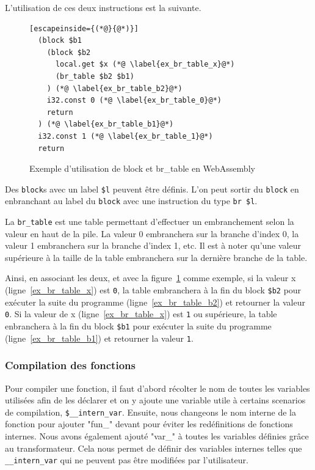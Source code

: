 \documentclass{rapportECL}
\begin{document}
L'utilisation de ces deux instructions est la suivante.

\begin{figure}[H]
	\begin{lstlisting}[escapeinside={(*@}{@*)}]
  (block $b1
    (block $b2
      local.get $x (*@ \label{ex_br_table_x}@*)
      (br_table $b2 $b1)
    ) (*@ \label{ex_br_table_b2}@*)
    i32.const 0 (*@ \label{ex_br_table_0}@*)
    return
  ) (*@ \label{ex_br_table_b1}@*)
  i32.const 1 (*@ \label{ex_br_table_1}@*)
  return
	\end{lstlisting}
	\caption{Exemple d'utilisation de block et br\_table en WebAssembly}
	\label{listing:example_block_br_table}
\end{figure}

Des \verb|block|s avec un label \verb|$l| peuvent être définis. L'on peut sortir du \verb|block| en enbranchant au label du 
\verb|block| avec une instruction du type \verb|br $l|.

La \verb|br_table| est une table permettant d'effectuer un embranchement selon la valeur en haut de la pile.
La valeur 0 embranchera sur la branche d'index 0, la valeur 1 embranchera sur la branche d'index 1, etc.
Il est à noter qu'une valeur supérieure à la taille de la table embranchera sur la dernière branche de la table.

Ainsi, en associant les deux, et avec la figure~\ref{listing:example_block_br_table} comme exemple, si la valeur x (ligne~\ref{ex_br_table_x})
est \verb|0|, la table embranchera à la fin du block \verb|$b2| pour exécuter la suite du programme (ligne~\ref{ex_br_table_b2}) et 
retourner la valeur \verb|0|. Si la valeur de x (ligne~\ref{ex_br_table_x}) est \verb|1| ou supérieure, la table enbranchera à la fin du 
block \verb|$b1| pour exécuter la suite du programme (ligne~\ref{ex_br_table_b1}) et retourner la valeur \verb|1|.

\subsubsection{Compilation des fonctions}

Pour compiler une fonction, il faut d'abord récolter le nom de toutes les variables utilisées afin de les 
déclarer et on y ajoute une variable utile à certains scenarios de compilation, \verb|$__intern_var|.
Ensuite, nous changeons le nom interne de la fonction pour ajouter "fun\_" devant pour éviter les 
redéfinitions de fonctions internes.
Nous avons également ajouté "var\_" à toutes les variables définies grâce au transformateur.
Cela nous permet de définir des variables internes telles que \verb|__intern_var| qui ne peuvent pas être modifiées par 
l'utilisateur.
\end{document}
